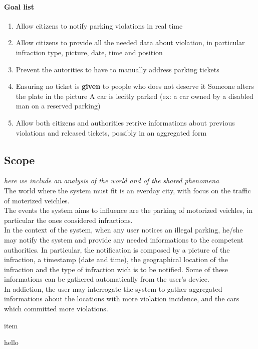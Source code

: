 \documentclass{article}
\newcommand{\enum}[1]{\texttt{#1.\arabic*}}
\begin{document}
\paragraph{Goal list}
\begin{enumerate}[label=\enum{G}]
	\item  Allow citizens to notify parking violations in real time
	\item Allow citizens to provide all the needed data about violation, in particular infraction type, picture, date, time and position
	\item Prevent the autorities to have to manually address parking tickets
	\item Ensuring no ticket is \textbf{given} to people who does not deserve it 
	\subitem Someone alters the plate in the picture
	\subitem A car is lecitly parked (ex: a car owned by a disabled man on a reserved parking)
	\item Allow both citizens and authorities retrive informations about previous violations and released tickets, possibly in an aggregated form 
\end{enumerate}

	\subsection{Scope} \textit{here we include an analysis of the world and of the shared phenomena}\\
	The world where the system must fit is an everday city, with focus on the traffic of moterized veichles.\\
	The events the system aims to influence are the parking of motorized veichles,  in particular the ones considered infractions.\\
	In the context of the system, when any user notices an illegal parking, he/she may notify the system and provide any needed informations to the competent authorities. In particular, the notification is composed by a picture of the infraction, a timestamp (date and time), the geographical location of the infraction and the type of infraction wich is to be notified. Some of these informations can be gathered automatically from the user's device.\\
	In addiction, the user may interrogate the system to gather aggregated informations about the locations with more violation incidence, and the cars which committed more violations. 
	\begin{list}{-}{World phenomena}
		\item item
	\end{list}
	\begin{list}{-}{Shared phenomena}
		\item hello
	\end{list}
\end{document}
